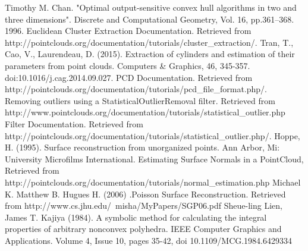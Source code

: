 \documentclass[runningheads,a4paper]{llncs}
\begin{document}
\begin{thebibliography}{4}
Timothy M. Chan. "Optimal output-sensitive convex hull algorithms in two and three dimensions". Discrete and Computational Geometry, Vol. 16, pp.361–368. 1996.
Euclidean Cluster Extraction Documentation. Retrieved from http://pointclouds.org/documentation/tutorials/cluster\_extraction/.
Tran, T., Cao, V., Laurendeau, D. (2015). Extraction of cylinders and estimation of their parameters from point clouds. Computers \& Graphics, 46, 345-357. doi:10.1016/j.cag.2014.09.027.
PCD Documentation. Retrieved from http://pointclouds.org/documentation/tutorials/pcd\_file\_format.php/.
 Removing outliers using a StatisticalOutlierRemoval filter. Retrieved from http://www.pointclouds.org/documentation/tutorials/statistical\_outlier.php
Filter Documentation. Retrieved from http://pointclouds.org/documentation/tutorials/statistical\_outlier.php/.
Hoppe, H. (1995). Surface reconstruction from unorganized points. Ann Arbor, Mi: University Microfilms International.
Estimating Surface Normals in a PointCloud, Retrieved from http://pointclouds.org/documentation/tutorials/normal\_estimation.php
Michael K. Matthew B. Hugues H. (2006) .Poisson Surface Reconstruction. Retrieved from http://www.cs.jhu.edu/~misha/MyPapers/SGP06.pdf
 Sheue-ling Lien, James T. Kajiya (1984). A symbolic method for calculating the integral properties of arbitrary nonconvex polyhedra. IEEE Computer Graphics and Applications. Volume 4, Issue 10, pages 35-42, doi 10.1109/MCG.1984.6429334
\end{thebibliography}



\end{document}
